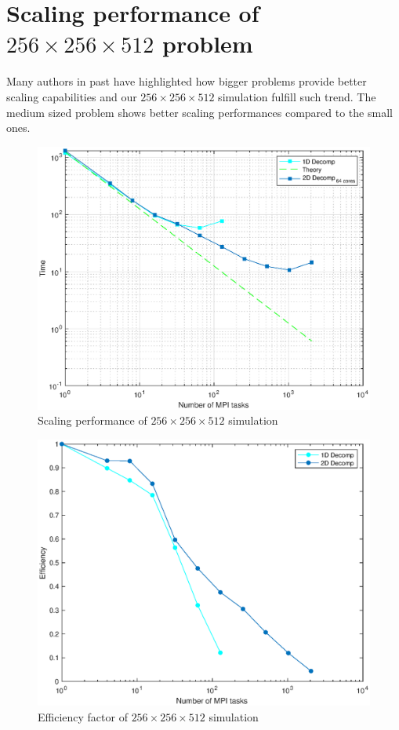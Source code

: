 \section{Scaling performance of $256\times 256\times 512$ problem}
Many authors in past have highlighted how bigger problems provide better scaling capabilities and our $256\times 256\times 512$ simulation fulfill such trend.
The medium sized problem shows better scaling performances compared to the small ones.
\par
\begin{figure}
\begin{center}
\includegraphics[scale=0.55]{grafici/1281}
\caption{Scaling performance of $256\times 256\times 512$  simulation}
\label{1281}
\end{center}
\end{figure}

\begin{figure}
\begin{center}
\includegraphics[scale=0.55]{grafici/1283}
\caption{Efficiency factor of $256\times 256\times 512$  simulation}
\label{1283}
\end{center}
\end{figure}

